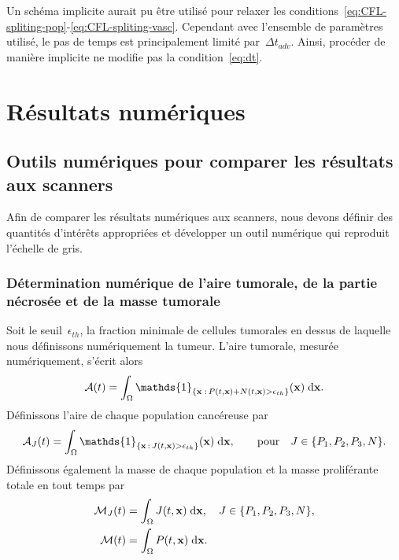 \documentclass[main.tex]{subfiles}
\begin{document}
Un schéma implicite aurait pu être utilisé pour relaxer les conditions~\eqref{eq:CFL-spliting-pop}-\eqref{eq:CFL-spliting-vasc}. 
Cependant avec l'ensemble de paramètres utilisé, le pas de temps est principalement limité par~$\Delta t_{adv}$. Ainsi, procéder de manière implicite ne modifie pas la condition~\eqref{eq:dt}.

\section{Résultats numériques}\label{sec:NumRes}

\subsection{Outils numériques pour comparer les résultats aux scanners}

Afin de comparer les résultats numériques aux scanners, nous devons définir des quantités d'intérêts appropriées et 
développer un outil numérique qui reproduit l'échelle de gris. 
\subsubsection{Détermination numérique de l'aire tumorale, de la partie nécrosée et de la masse tumorale}

Soit le seuil~$\epsilon_{th}$, la fraction minimale de cellules tumorales en dessus de laquelle nous définissons numériquement la tumeur. 
L'aire tumorale, mesurée numériquement, s'écrit alors
\begin{equation}
\label{eq:airetot}
\mathcal{A}(t)=\int_\Omega \mathds{1}_{\{\vecx\;:\,P(t,\vecx)+N(t,\vecx) >\epsilon_{th}\}}(\vecx)\textrm{\;d}\vecx.
\end{equation}
Définissons l'aire de chaque population cancéreuse par
\begin{equation}
\mathcal{A}_J(t)=\int_\Omega
\mathds{1}_{\{\vecx\,:\,J(t,\vecx)>\epsilon_{th}\}}(\vecx)\textrm{\;d}\vecx,
\qquad \text{pour}\quad J \in \{P_1,P_2,P_3,N \}.
\label{eq:airepop}
\end{equation}
Définissons également la masse de chaque population et la masse proliférante totale en tout temps par 
\begin{align}
\mathcal{M}_J(t)&=\int_\Omega J(t,\mathbf{x}) \textrm{\;d}\mathbf{x}, \quad J \in \{P_1,P_2,P_3,N \},
\label{eq:masspop} \\
\mathcal{M}(t)&=\int_\Omega P 
(t,\mathbf{x})\textrm{\;d}\mathbf{x}.
\label{eq:masstot}
\end{align}
\end{document}
